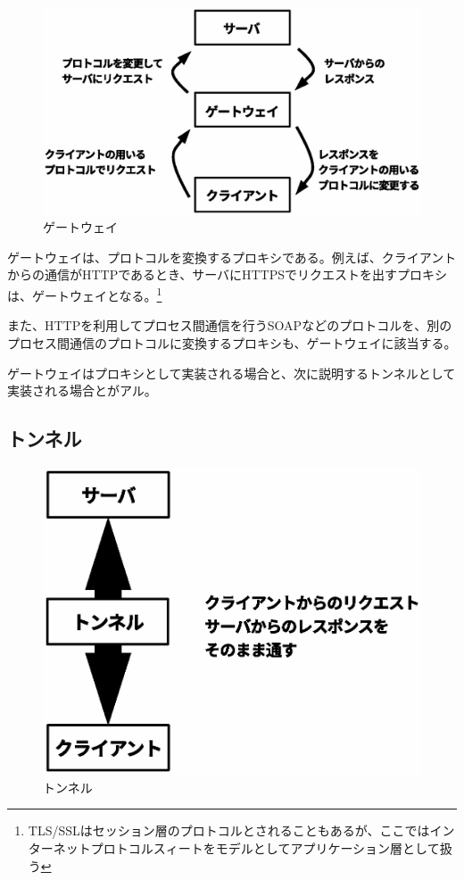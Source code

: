 \begin{figure}[htbp]
	\includegraphics[width=12cm,clip]{draw/fig4.eps}
	\caption{ゲートウェイ}
	\label{fig:gateway}
\end{figure}

ゲートウェイは、プロトコルを変換するプロキシである。例えば、クライアントからの通信がHTTPであるとき、サーバにHTTPSでリクエストを出すプロキシは、ゲートウェイとなる。\footnote{TLS/SSLはセッション層のプロトコルとされることもあるが、ここではインターネットプロトコルスィートをモデルとしてアプリケーション層として扱う}

また、HTTPを利用してプロセス間通信を行うSOAPなどのプロトコルを、別のプロセス間通信のプロトコルに変換するプロキシも、ゲートウェイに該当する。

ゲートウェイはプロキシとして実装される場合と、次に説明するトンネルとして実装される場合とがアル。

\subsection{トンネル}

\begin{figure}[htbp]
	\includegraphics[width=12cm,clip]{draw/fig5.eps}
	\caption{トンネル}
	\label{fig:tunnel}
\end{figure}


